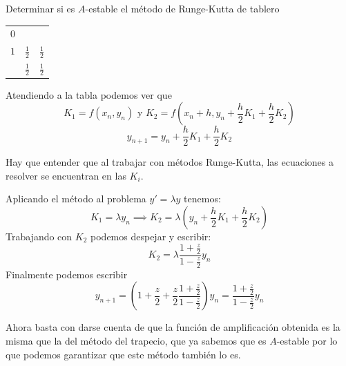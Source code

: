 \begin{problem}[5]
Determinar si es $A$-estable el método de Runge-Kutta de tablero
\begin{center}
\begin{tabular}{c|cc}
$0$ & & \\
$1$ & $\frac{1}{2}$ & $\frac{1}{2}$ \\
\hline
 & $\frac{1}{2}$ & $\frac{1}{2}$\\
\end{tabular}
\end{center}
\solution
Atendiendo a la tabla podemos ver que
\[K_1 = f(x_n,y_n) \text{ y } K_2=f\left(x_n+h,y_n+\frac{h}{2}K_1+\frac{h}{2}K_2\right)\]
\[y_{n+1} = y_n + \frac{h}{2}K_1 + \frac{h}{2}K_2\]

Hay que entender que al trabajar con métodos Runge-Kutta, las ecuaciones a resolver se encuentran en las $K_i$.

Aplicando el método al problema $y'=λy$ tenemos:
\[K_1 = λy_n \implies K_2 = λ\left(y_n+\frac{h}{2}K_1+\frac{h}{2}K_2\right)\]
Trabajando con $K_2$ podemos despejar y escribir:
\[K_2 = λ \frac{1+\frac{z}{2}}{1-\frac{z}{2}}y_n\]
Finalmente podemos escribir
\[y_{n+1} = \left(1+\frac{z}{2}+\frac{z}{2}\frac{1+\frac{z}{2}}{1-\frac{z}{2}} \right)y_n = \frac{1+\frac{z}{2}}{1-\frac{z}{2}}y_n\]

Ahora basta con darse cuenta de que la función de amplificación obtenida es la misma que la del método del trapecio, que ya sabemos que es $A$-estable por lo que podemos garantizar que este método también lo es.
\end{problem}
